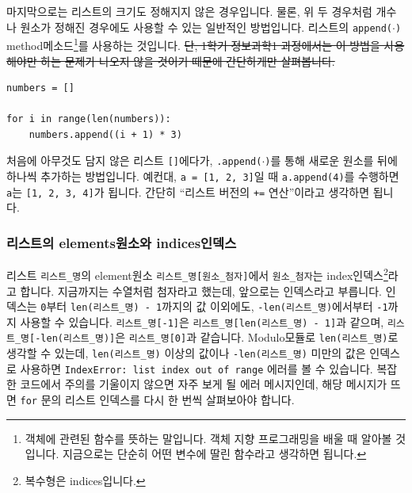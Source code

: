 \documentclass[../main.tex]{subfiles}
\begin{document}
마지막으로는 리스트의 크기도 정해지지 않은 경우입니다.
물론, 위 두 경우처럼 개수나 원소가 정해진 경우에도 사용할 수 있는 일반적인 방법입니다.
리스트의 \texttt{append($\cdot$)} method메소드\footnote{객체에 관련된 함수를 뜻하는 말입니다. 객체 지향 프로그래밍을 배울 때 알아볼 것입니다. 지금으로는 단순히 어떤 변수에 딸린 함수라고 생각하면 됩니다.}를 사용하는 것입니다.
\sout{단, 1학기 정보과학1 과정에서는 이 방법을 사용해야만 하는 문제가 나오지 않을 것이기 때문에 간단하게만 살펴봅니다.}
\begin{verbatim}
numbers = []

for i in range(len(numbers)):
	numbers.append((i + 1) * 3)
\end{verbatim}
처음에 아무것도 담지 않은 리스트 \texttt{[]}에다가, \texttt{.append($\cdot$)}를 통해 새로운 원소를 뒤에 하나씩 추가하는 방법입니다.
예컨대, \texttt{a = [1, 2, 3]}일 때 \texttt{a.append(4)}를 수행하면 \texttt{a}는 \texttt{[1, 2, 3, 4]}가 됩니다.
간단히 ``리스트 버전의 \texttt{+=} 연산''이라고 생각하면 됩니다.

\subsubsection{리스트의 elements원소와 indices인덱스}
리스트 \texttt{리스트\_명}의 element원소 \texttt{리스트\_명[원소\_첨자]}에서 \texttt{원소\_첨자}는 index인덱스\footnote{복수형은 indices입니다.}라고 합니다.
지금까지는 수열처럼 첨자라고 했는데, 앞으로는 인덱스라고 부릅니다.
인덱스는 \texttt{0}부터 \texttt{len(리스트\_명) - 1}까지의 값 이외에도, \texttt{-len(리스트\_명)}에서부터 \texttt{-1}까지 사용할 수 있습니다.
\texttt{리스트\_명[-1]}은 \texttt{리스트\_명[len(리스트\_명) - 1]}과 같으며, \texttt{리스트\_명[-len(리스트\_명)]}은 \texttt{리스트\_명[0]}과 같습니다.
Modulo모듈로 \texttt{len(리스트\_명)}로 생각할 수 있는데, \texttt{len(리스트\_명)} 이상의 값이나 \texttt{-len(리스트\_명)} 미만의 값은 인덱스로 사용하면 \texttt{IndexError: list index out of range} 에러를 볼 수 있습니다.
복잡한 코드에서 주의를 기울이지 않으면 자주 보게 될 에러 메시지인데, 해당 메시지가 뜨면 \texttt{for} 문의 리스트 인덱스를 다시 한 번씩 살펴보아야 합니다.
\end{document}
